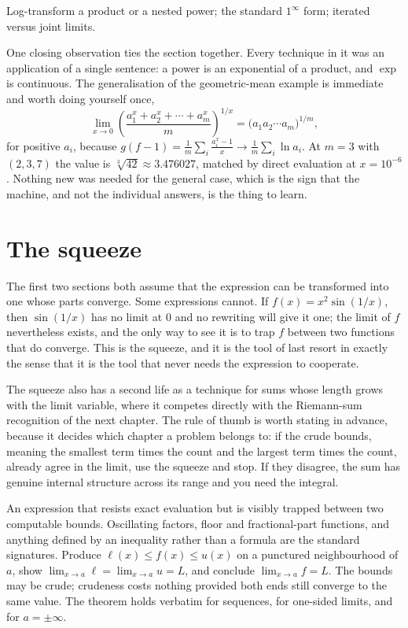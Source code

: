 \begin{seealsob}Log-transform a product or a nested power; the standard $1^{\infty}$ form; iterated versus joint limits.\end{seealsob}

One closing observation ties the section together. Every technique in it was an application of a single sentence: a power is an exponential of a product, and $\exp$ is continuous. The generalisation of the geometric-mean example is immediate and worth doing yourself once,
\[\lim_{x\to0}\left(\frac{a_{1}^{x}+a_{2}^{x}+\cdots+a_{m}^{x}}{m}\right)^{1/x}=\bigl(a_{1}a_{2}\cdots a_{m}\bigr)^{1/m},\]
for positive $a_{i}$, because $g(f-1)=\tfrac1m\sum_{i}\tfrac{a_{i}^{x}-1}{x}\to\tfrac1m\sum_{i}\ln a_{i}$. At $m=3$ with $(2,3,7)$ the value is $\sqrt[3]{42}\approx3.476027$, matched by direct evaluation at $x=10^{-6}$. Nothing new was needed for the general case, which is the sign that the machine, and not the individual answers, is the thing to learn.

\section{The squeeze}

The first two sections both assume that the expression can be transformed into one whose parts converge. Some expressions cannot. If $f(x)=x^{2}\sin(1/x)$, then $\sin(1/x)$ has no limit at $0$ and no rewriting will give it one; the limit of $f$ nevertheless exists, and the only way to see it is to trap $f$ between two functions that do converge. This is the squeeze, and it is the tool of last resort in exactly the sense that it is the tool that never needs the expression to cooperate.

The squeeze also has a second life as a technique for sums whose length grows with the limit variable, where it competes directly with the Riemann-sum recognition of the next chapter. The rule of thumb is worth stating in advance, because it decides which chapter a problem belongs to: if the crude bounds, meaning the smallest term times the count and the largest term times the count, already agree in the limit, use the squeeze and stop. If they disagree, the sum has genuine internal structure across its range and you need the integral.

\cue An expression that resists exact evaluation but is visibly trapped between two computable bounds. Oscillating factors, floor and fractional-part functions, and anything defined by an inequality rather than a formula are the standard signatures.
\method Produce $\ell(x)\leq f(x)\leq u(x)$ on a punctured neighbourhood of $a$, show $\lim_{x\to a}\ell=\lim_{x\to a}u=L$, and conclude $\lim_{x\to a}f=L$. The bounds may be crude; crudeness costs nothing provided both ends still converge to the same value. The theorem holds verbatim for sequences, for one-sided limits, and for $a=\pm\infty$.


